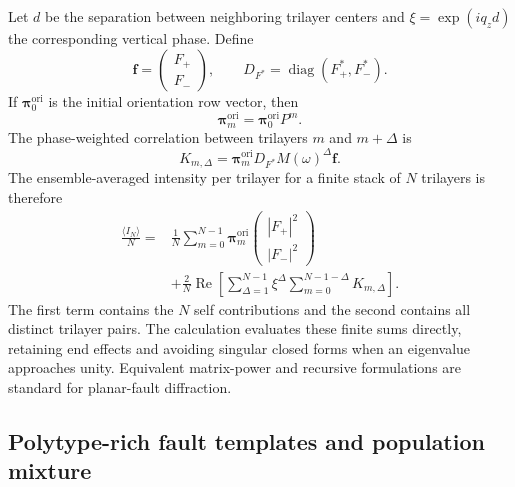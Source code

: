 \documentclass[11pt]{article}
\begin{document}
Let $d$ be the separation between neighboring trilayer centers and
$\xi=\exp(iq_zd)$ the corresponding vertical phase.  Define
\begin{equation}
 \mathbf f=\begin{pmatrix}F_+\\F_-\end{pmatrix},\qquad
 D_{F^*}=\operatorname{diag}(F_+^*,F_-^*).
 \label{eq:si_pbi2_form_vector}
\end{equation}
If $\boldsymbol{\pi}^{\mathrm{ori}}_0$ is the initial orientation row vector,
then
\begin{equation}
 \boldsymbol{\pi}^{\mathrm{ori}}_m
 =\boldsymbol{\pi}^{\mathrm{ori}}_0P^m.
 \label{eq:si_pbi2_orientation_population}
\end{equation}
The phase-weighted correlation between trilayers $m$ and $m+\Delta$ is
\begin{equation}
 K_{m,\Delta}=\boldsymbol{\pi}^{\mathrm{ori}}_m
 D_{F^*}M(\omega)^\Delta\mathbf f.
 \label{eq:si_pbi2_pair_kernel}
\end{equation}
The ensemble-averaged intensity per trilayer for a finite stack of $N$
trilayers is therefore
\begin{align}
 \frac{\langle I_N\rangle}{N}={}&
 \frac{1}{N}\sum_{m=0}^{N-1}
 \boldsymbol{\pi}^{\mathrm{ori}}_m
 \begin{pmatrix}|F_+|^2\\|F_-|^2\end{pmatrix}
 \nonumber\\
 &+\frac{2}{N}\operatorname{Re}\!\left[
 \sum_{\Delta=1}^{N-1}\xi^\Delta
 \sum_{m=0}^{N-1-\Delta}K_{m,\Delta}\right].
 \label{eq:si_pbi2_finite_intensity}
\end{align}
The first term contains the $N$ self contributions and the second contains all
distinct trilayer pairs.  The calculation evaluates these finite sums
directly, retaining end effects and avoiding singular closed forms when an
eigenvalue approaches unity.  Equivalent matrix-power and recursive
formulations are standard for planar-fault diffraction.\cite{Treacy1991}

\subsection{Polytype-rich fault templates and population mixture}
\end{document}
